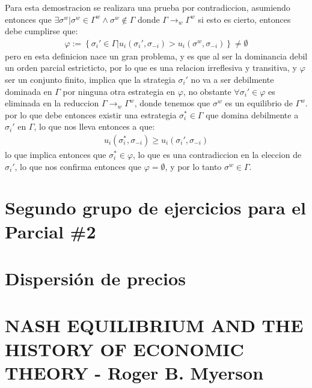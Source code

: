 \documentclass[11pt]{article}
\begin{document}
\begin{flushleft}
    Para esta demostracion se realizara una prueba por contradiccion, asumiendo entonces que
    $\exists\sigma^w|\sigma^w\in\Gamma^{w}\land\sigma^w\notin\Gamma$ donde $\Gamma \to_{w} \Gamma^{w}$
    si esto es cierto, entonces debe cumplirse que:
    \begin{align*}
        \varphi := \left\{\sigma_i'\in\Gamma|u_i(\sigma_i',\sigma_{-i})>u_i(\sigma^w,\sigma_{-i})\right\} \neq \emptyset
    \end{align*} 
    pero en esta definicion nace un gran problema, y es que al ser la dominancia debil
    un orden parcial estricticto, por lo que es una relacion irreflesiva y transitiva, y $\varphi$
    ser un conjunto finito, implica que la strategia $\sigma_i'$ no va a ser debilmente dominada en $\Gamma$
    por ninguna otra estrategia en $\varphi$, no obstante $\forall\sigma_i'\in\varphi$ es eliminada
    en la reduccion $\Gamma \to_{w} \Gamma^{w}$, donde tenemos que $\sigma^w$ es un equilibrio
    de $\Gamma^{w}$. por lo que debe entonces existir una estrategia $\sigma^*_i\in\Gamma$
    que domina debilmente a $\sigma_i'$ en $\Gamma$, lo que nos lleva entonces a que:
    \begin{align*}
        u_i(\sigma^*_i,\sigma_{-i})\geq u_i(\sigma_i',\sigma_{-i})
    \end{align*}
    lo que implica entonces que $\sigma^*_i\in\varphi$, lo que es una contradiccion en la
    eleccion de $\sigma_i'$, lo que nos confirma entonces que $\varphi = \emptyset$, y por lo tanto
    $\sigma^w\in\Gamma$.
\end{flushleft}

\section{Segundo grupo de ejercicios para el Parcial \#2}
\begin{flushleft}
    
\end{flushleft}

\section{Dispersión de precios}
\begin{flushleft}
    
\end{flushleft}

\section{NASH EQUILIBRIUM AND THE HISTORY OF ECONOMIC THEORY - Roger B. Myerson}
\begin{flushleft}
    
\end{flushleft}
\end{document}
